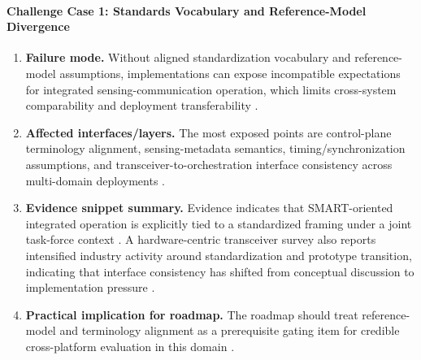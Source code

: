 \paragraph{Challenge Case 1: Standards Vocabulary and Reference-Model Divergence}
\begin{enumerate}
    \item \textbf{Failure mode.} Without aligned standardization vocabulary and reference-model assumptions, implementations can expose incompatible expectations for integrated sensing-communication operation, which limits cross-system comparability and deployment transferability \cite{O_ISAC_220, O_ISAC_161}.
    \item \textbf{Affected interfaces/layers.} The most exposed points are control-plane terminology alignment, sensing-metadata semantics, timing/synchronization assumptions, and transceiver-to-orchestration interface consistency across multi-domain deployments \cite{O_ISAC_220, O_ISAC_161}.
    \item \textbf{Evidence snippet summary.} Evidence indicates that SMART-oriented integrated operation is explicitly tied to a standardized framing under a joint task-force context \cite{O_ISAC_220}. A hardware-centric transceiver survey also reports intensified industry activity around standardization and prototype transition, indicating that interface consistency has shifted from conceptual discussion to implementation pressure \cite{O_ISAC_161}.
    \item \textbf{Practical implication for roadmap.} The roadmap should treat reference-model and terminology alignment as a prerequisite gating item for credible cross-platform evaluation in this domain \cite{O_ISAC_220, O_ISAC_161}.
\end{enumerate}

